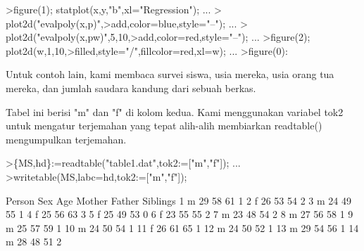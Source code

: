 \documentclass[a4paper,10pt]{article}
\begin{document}
\begin{eulernotebook}
\begin{eulercomment}
\begin{eulercomment}
\begin{eulercomment}
\begin{eulercomment}
\begin{eulercomment}
\begin{eulercomment}
\begin{eulercomment}
\begin{eulercomment}
\begin{eulercomment}
\begin{eulercomment}
\begin{eulercomment}
\begin{eulercomment}
\begin{eulercomment}
\begin{eulercomment}
\begin{eulercomment}
\begin{eulercomment}
\begin{eulercomment}
\begin{eulercomment}
\begin{eulercomment}
\begin{eulercomment}
\begin{eulercomment}
\begin{eulercomment}
\begin{eulercomment}
\begin{eulercomment}
\begin{eulercomment}
\begin{eulercomment}
\begin{eulercomment}
\begin{eulercomment}
\begin{eulercomment}
\begin{eulercomment}
\begin{eulercomment}
\begin{eulercomment}
\begin{eulerprompt}
>figure(1); statplot(x,y,"b",xl="Regression"); ...
>  plot2d("evalpoly(x,p)",>add,color=blue,style="--"); ...
>  plot2d("evalpoly(x,pw)",5,10,>add,color=red,style="--"); ...
>figure(2); plot2d(w,1,10,>filled,style="/",fillcolor=red,xl=w); ...
>figure(0):
\end{eulerprompt}
\begin{eulercomment}
Untuk contoh lain, kami membaca survei siswa, usia mereka, usia orang
tua mereka, dan jumlah saudara kandung dari sebuah berkas.

Tabel ini berisi "m" dan "f" di kolom kedua. Kami menggunakan variabel
tok2 untuk mengatur terjemahan yang tepat alih-alih membiarkan
readtable() mengumpulkan terjemahan.
\end{eulercomment}
\begin{eulerprompt}
>\{MS,hd\}:=readtable("table1.dat",tok2:=["m","f"]);  ...
>writetable(MS,labc=hd,tok2:=["m","f"]);
\end{eulerprompt}
\begin{euleroutput}
      Person       Sex       Age    Mother    Father  Siblings
           1         m        29        58        61         1
           2         f        26        53        54         2
           3         m        24        49        55         1
           4         f        25        56        63         3
           5         f        25        49        53         0
           6         f        23        55        55         2
           7         m        23        48        54         2
           8         m        27        56        58         1
           9         m        25        57        59         1
          10         m        24        50        54         1
          11         f        26        61        65         1
          12         m        24        50        52         1
          13         m        29        54        56         1
          14         m        28        48        51         2

\end{euleroutput}
\end{eulercomment}
\end{eulercomment}
\end{eulercomment}
\end{eulercomment}
\end{eulercomment}
\end{eulercomment}
\end{eulercomment}
\end{eulercomment}
\end{eulercomment}
\end{eulercomment}
\end{eulercomment}
\end{eulercomment}
\end{eulercomment}
\end{eulercomment}
\end{eulercomment}
\end{eulercomment}
\end{eulercomment}
\end{eulercomment}
\end{eulercomment}
\end{eulercomment}
\end{eulercomment}
\end{eulercomment}
\end{eulercomment}
\end{eulercomment}
\end{eulercomment}
\end{eulercomment}
\end{eulercomment}
\end{eulercomment}
\end{eulercomment}
\end{eulercomment}
\end{eulercomment}
\end{eulercomment}
\end{eulernotebook}
\end{document}
